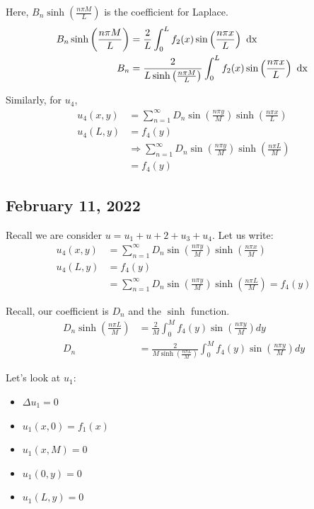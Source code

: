 \documentclass{article}
\begin{document}
Here, $B_n \sinh\left( \frac{n \pi M}{L}\right)$ is the coefficient for Laplace.
%
\begin{align}
  B_n \sinh \left( \frac{n \pi M}{L} \right) & = \frac{2}{L} \int^L_0 f_2(x) \sin\left(\frac{n \pi x}{L}\right) \text{ dx }\\
  B_n & = \frac{2}{L \sinh\left(\frac{n \pi M}{L}\right)} \int^L_0 f_2(x) \sin\left(\frac{n \pi x}{L}\right) \text{ dx }
\end{align}

Similarly, for $u_4$,
%
\begin{align}
  u_4(x, y) & = \sum^\infty_{n = 1} D_n \sin\left(\frac{n \pi y}{M}\right)\sinh\left(\frac{n \pi x}{L}\right)\\
  u_4(L, y) & = f_4(y)\\
  & \Rightarrow \sum^\infty_{n = 1} D_n \sin\left(\frac{n \pi y}{M}\right) \sinh\left(\frac{n \pi L}{M}\right)\\
  & = f_4(y)
\end{align}

\bigbreak

\subsection*{February 11, 2022}
Recall we are consider $u = u_1 + u+2 + u_3 + u_4$. Let us write:
%
\begin{align}
  u_4(x, y) & = \sum^\infty_{n = 1} D_n \sin\left( \frac{n \pi y}{M}\right)\sinh\left(\frac{n \pi x}{M}\right)\\
  u_4(L, y) & = f_4(y)\\
  & = \sum^\infty_{n = 1} D_n \sin\left( \frac{n \pi y}{M} \right) \sinh\left( \frac{n \pi L}{M} \right) = f_4(y)
\end{align}

Recall, our coefficient is $D_n$ and the $\sinh$ function.
%
\begin{align}
  D_n \sinh\left( \frac{n \pi L}{M} \right) & =
  \frac{2}{M} \int^M_0 f_4(y) \sin\left( \frac{n \pi y}{M} \right) dy\\
  D_n & = \frac{2}{M \sinh\left( \frac{n \pi L}{M} \right)} \int^M_0 f_4(y) \sin\left( \frac{n \pi y}{M} \right) dy
\end{align}

Let's look at $u_1$:
\begin{itemize}
  \item $\Delta u_1 = 0$
  \item $u_1(x, 0) = f_1(x)$
  \item $u_1(x, M) = 0$
  \item $u_1(0, y) = 0$
  \item $u_1(L, y) = 0$
\end{itemize}
\end{document}
